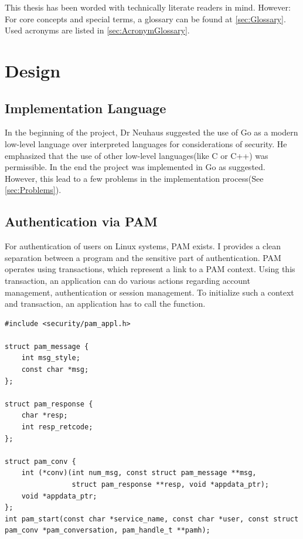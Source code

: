\documentclass[10pt,a4paper,titlepage,twoside,english,final]{zhawreprt}
\begin{document}
\vspace{1.5cm}
This thesis has been worded with technically literate readers in mind. However: For core concepts and special terms, a glossary can be found at \ref{sec:Glossary}. Used acronyms are listed in \ref{sec:AcronymGlossary}.

\chapter{Design}\label{chp:Design}
\section{Implementation Language}\label{sec:ImplementationLanguage}
In the beginning of the project, Dr Neuhaus suggested the use of \gls{Go} as a modern low-level language over interpreted languages for considerations of security. He emphasized that the use of other low-level languages(like \gls{C} or \gls{C++}) was permissible. In the end the project was implemented in \gls{Go} as suggested.\\
However, this lead to a few problems in the implementation process(See \ref{sec:Problems}).

\section{Authentication via PAM}\label{sec:AuthViaPAM}
For authentication of users on Linux systems, \gls{PAM} exists. I provides a clean separation between a program and the sensitive part of authentication. \gls{PAM} operates using transactions, which represent a link to a \gls{PAM} context. Using this transaction, an application can do various actions regarding account management, authentication or session management. To initialize such a context and transaction, an application has to call the \cite{pam_start} function.
\setlistingC
\begin{lstlisting}[caption={Initializing a \gls{PAM} context},label=lst:InitPAMContext]
#include <security/pam_appl.h>

struct pam_message {
    int msg_style;
    const char *msg;
};

struct pam_response {
    char *resp;
    int resp_retcode;
};

struct pam_conv {
    int (*conv)(int num_msg, const struct pam_message **msg,
                struct pam_response **resp, void *appdata_ptr);
    void *appdata_ptr;
};
int pam_start(const char *service_name, const char *user, const struct pam_conv *pam_conversation, pam_handle_t **pamh);
\end{lstlisting}
\end{document}
